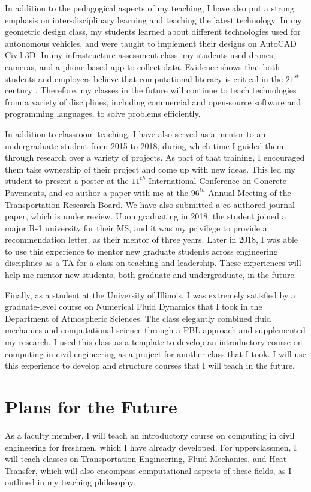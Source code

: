 \documentclass[12pt]{article}
\begin{document}
In addition to the pedagogical aspects of my teaching, I have also put a strong emphasis on inter-disciplinary learning and teaching the latest technology. In my geometric design class, my students learned about different technologies used for autonomous vehicles, and were taught to implement their designs on AutoCAD Civil 3D. In my infrastructure assessment class, my students used drones, cameras, and a phone-based app to collect data. Evidence shows that both students and employers believe that computational literacy is critical in the $21^{st}$ century \cite{magana2012motivation}. Therefore, my classes in the future will continue to teach technologies from a variety of disciplines, including commercial and open-source software and programming languages, to solve problems efficiently. 

In addition to classroom teaching, I have also served as a mentor to an undergraduate student from 2015 to 2018, during which time I guided them through research over a variety of projects. As part of that training, I encouraged them take ownership of their project and come up with new ideas. This led my student to present a poster at the $11^{th}$ International Conference on Concrete Pavements, and co-author a paper with me at the $96^{th}$ Annual Meeting of the Transportation Research Board. We have also submitted a co-authored journal paper, which is under review. Upon graduating in 2018, the student joined a major R-1 university for their MS, and it was my privilege to provide a recommendation letter, as their mentor of three years. Later in 2018, I was able to use this experience to mentor new graduate students across engineering disciplines as a TA for a class on teaching and leadership. These experiences will help me mentor new students, both graduate and undergraduate, in the future.

Finally, as a student at the University of Illinois, I was extremely satisfied by a graduate-level course on Numerical Fluid Dynamics that I took in the Department of Atmospheric Sciences. The class elegantly combined fluid mechanics and computational science through a PBL-approach and supplemented my research. I used this class as a template to develop an introductory course on computing in civil engineering as a project for another class that I took. I will use this experience to develop and structure courses that I will teach in the future.  

\section*{Plans for the Future}
As a faculty member, I will teach an introductory course on computing in civil engineering for freshmen, which I have already developed. For upperclassmen, I will teach classes on Transportation Engineering, Fluid Mechanics, and Heat Transfer, which will also encompass computational aspects of these fields, as I outlined in my teaching philosophy. 
\end{document}
